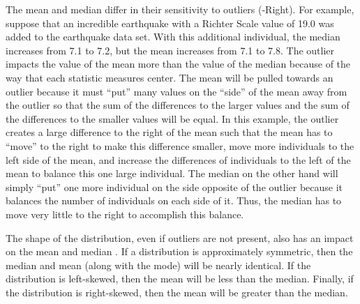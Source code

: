 \documentclass[10pt,openany]{book}\usepackage[]{graphicx}\usepackage[]{color}
\begin{document}
The mean and median differ in their sensitivity to outliers (-Right). For example, suppose that an incredible earthquake with a Richter Scale value of 19.0 was added to the earthquake data set. With this additional individual, the median increases from 7.1 to 7.2, but the mean increases from 7.1 to 7.8. The outlier impacts the value of the mean more than the value of the median because of the way that each statistic measures center. The mean will be pulled towards an outlier because it must ``put'' many values on the ``side'' of the mean away from the outlier so that the sum of the differences to the larger values and the sum of the differences to the smaller values will be equal. In this example, the outlier creates a large difference to the right of the mean such that the mean has to ``move'' to the right to make this difference smaller, move more individuals to the left side of the mean, and increase the differences of individuals to the left of the mean to balance this one large individual. The median on the other hand will simply ``put'' one more individual on the side opposite of the outlier because it balances the number of individuals on each side of it. Thus, the median has to move very little to the right to accomplish this balance.


The shape of the distribution, even if outliers are not present, also has an impact on the mean and median . If a distribution is approximately symmetric, then the median and mean (along with the mode) will be nearly identical. If the distribution is left-skewed, then the mean will be less than the median. Finally, if the distribution is right-skewed, then the mean will be greater than the median.
\end{document}
